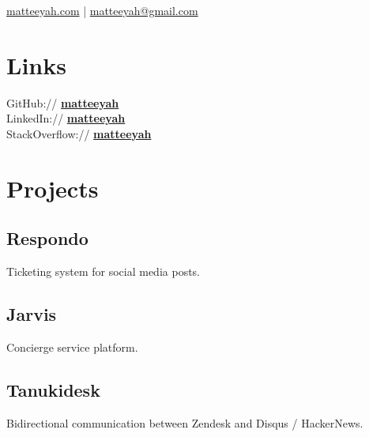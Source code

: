\documentclass[]{matija-resume}
\begin{document}
%
%
\lastupdated

%
%
 {
\href{https://matteeyah.com}{matteeyah.com} |
\href{mailto:matteeyah@gmail.com}{matteeyah@gmail.com}
}

%
%

\begin{minipage}[t]{0.33\textwidth}



\section{Links}
GitHub:// \href{https://github.com/matteeyah}{\bf matteeyah \faExternalLink} \\
LinkedIn://  \href{https://www.linkedin.com/in/matteeyah}{\bf matteeyah \faExternalLink} \\
StackOverflow://  \href{https://stackoverflow.com/users/1139722/matteeyah}{\bf matteeyah \faExternalLink}


\section{Projects}
\subsection{Respondo}
Ticketing system for social media posts.
\sectionsep

\subsection{Jarvis}
Concierge service platform.
\sectionsep

\subsection{Tanukidesk}
Bidirectional communication between Zendesk and Disqus / HackerNews.
\sectionsep


\end{minipage}
\end{document}
